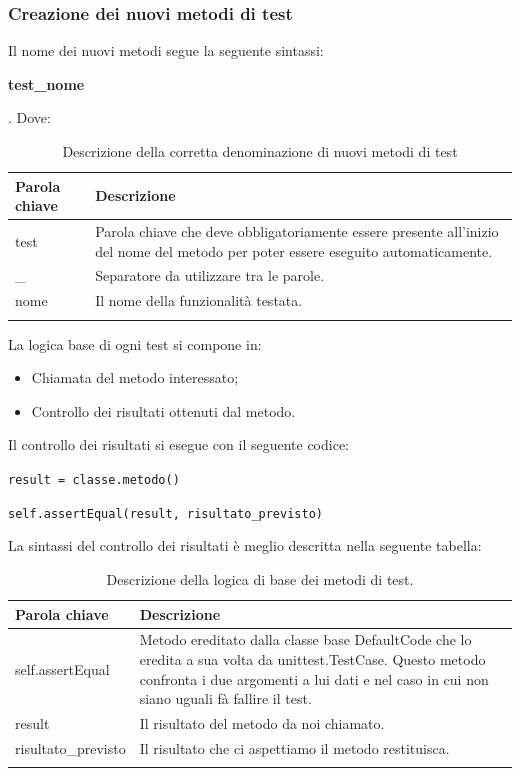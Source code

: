 \subsubsection{Creazione dei nuovi metodi di test}
Il nome dei nuovi metodi segue la seguente sintassi:\newline{}\centerline{\textbf{test\_nome}}. Dove:
{
	\setlength{\freewidth}{\dimexpr\textwidth-1\tabcolsep}
	\renewcommand{\arraystretch}{1.5}
	\setlength{\aboverulesep}{0pt}
	\setlength{\belowrulesep}{0pt}
	\begin{longtable}{L{.15\freewidth} L{.85\freewidth}}
		\textbf{Parola chiave} & \textbf{Descrizione}\\
		\toprule
		\endhead	
		test & Parola chiave che deve obbligatoriamente essere presente all'inizio del nome del metodo per poter essere eseguito automaticamente.\\
		\_ & Separatore da utilizzare tra le parole.\\
		nome & Il nome della funzionalità testata.\\
		\bottomrule
		\hiderowcolors
		\caption{Descrizione della corretta denominazione di nuovi metodi di test}
	\end{longtable}
}

La logica base di ogni test si compone in:
\begin{itemize}
	\item Chiamata del metodo interessato;
	\item Controllo dei risultati ottenuti dal metodo.
\end{itemize}

Il controllo dei risultati si esegue con il seguente codice:\newline{} \centerline{\texttt{result = classe.metodo()}}\newline{}\centerline{\texttt{self.assertEqual(result, risultato\_previsto)}}\newline{}
La sintassi del controllo dei risultati è meglio descritta nella seguente tabella:
{
	\setlength{\freewidth}{\dimexpr\textwidth-1\tabcolsep}
	\renewcommand{\arraystretch}{1.5}
	\setlength{\aboverulesep}{0pt}
	\setlength{\belowrulesep}{0pt}
	\begin{longtable}{L{.15\freewidth} L{.85\freewidth}}
		\textbf{Parola chiave} & \textbf{Descrizione}\\
		\toprule
		\endhead	
		self.assertEqual & Metodo ereditato dalla classe base DefaultCode che lo eredita a sua volta da unittest.TestCase. Questo metodo confronta i due argomenti a lui dati e nel caso in cui non siano uguali fà fallire il test.\\
		result & Il risultato del metodo da noi chiamato. \\
		risultato\_previsto & Il risultato che ci aspettiamo il metodo restituisca.\\
		\bottomrule
		\hiderowcolors
		\caption{Descrizione della logica di base dei metodi di test.}
	\end{longtable}
}






